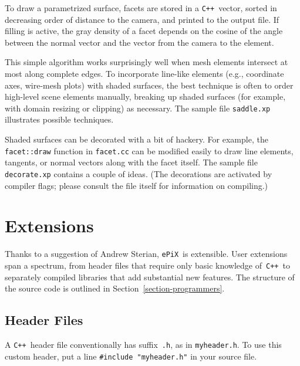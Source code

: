 \documentclass[12pt,letterpaper]{book}
\newcommand{\code}[1]{\texttt{#1}}
\newcommand{\filename}[1]{\texttt{#1}}
\newcommand{\ePiX}{\code{ePiX}}
\newcommand{\CXX}{\code{C++}}
\begin{document}
To draw a parametrized surface, facets are stored in a \CXX\ vector,
sorted in decreasing order of distance to the camera, and printed to
the output file. If filling is active, the gray density of a facet
depends on the cosine of the angle between the normal vector and the
vector from the camera to the element.

This simple algorithm works surprisingly well when mesh elements
intersect at most along complete edges. To incorporate line-like
elements (e.g., coordinate axes, wire-mesh plots) with shaded
surfaces, the best technique is often to order high-level scene
elements manually, breaking up shaded surfaces (for example, with
domain resizing or clipping) as necessary. The sample file
\filename{saddle.xp} illustrates possible techniques.

Shaded surfaces can be decorated with a bit of hackery. For example,
the \code{facet::draw} function in \filename{facet.cc} can be
modified easily to draw line elements, tangents, or normal vectors
along with the facet itself. The sample file
\filename{decorate.xp} contains a couple of ideas. (The
decorations are activated by compiler flags; please consult the file
itself for information on compiling.)


\section{Extensions}
\label{section-extensions}

Thanks to a suggestion of Andrew Sterian, \ePiX\ is extensible. User
extensions span a spectrum, from header files that require only basic
knowledge of~\CXX\ to separately compiled libraries that add
substantial new features.  The structure of the source code is
outlined in Section~\ref{section-programmers}.


\subsection{Header Files}

A \CXX~header file conventionally has suffix~\filename{.h}, as in
\filename{myheader.h}. To use this custom header, put a line
\code{\#include "myheader.h"} in your source file.
\end{document}
